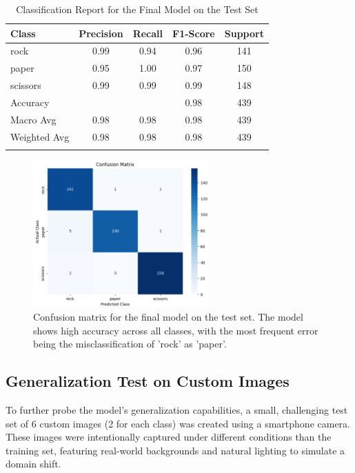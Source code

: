 \documentclass[pdflatex,sn-mathphys-num]{sn-jnl}%
\theoremstyle{thmstyleone}%
\theoremstyle{thmstyletwo}%
\theoremstyle{thmstylethree}%
\begin{document}
\begin{table}[h]
\caption{Classification Report for the Final Model on the Test Set}\label{tab:report}%
\begin{tabular}{@{}lcccc@{}}
\toprule
Class & Precision & Recall & F1-Score & Support \\
\midrule
rock     & 0.99 & 0.94 & 0.96 & 141 \\
paper    & 0.95 & 1.00 & 0.97 & 150 \\
scissors & 0.99 & 0.99 & 0.99 & 148 \\
\midrule
Accuracy &      &      & 0.98 & 439 \\
Macro Avg & 0.98 & 0.98 & 0.98 & 439 \\
Weighted Avg & 0.98 & 0.98 & 0.98 & 439 \\
\botrule
\end{tabular}
\end{table}

\begin{figure}[h]
\centering
\includegraphics[width=0.6\textwidth]{confusion_matrix.png}
\caption{Confusion matrix for the final model on the test set. The model shows high accuracy across all classes, with the most frequent error being the misclassification of 'rock' as 'paper'.}\label{fig:cm}
\end{figure}

\subsection{Generalization Test on Custom Images}
To further probe the model's generalization capabilities, a small, challenging test set of 6 custom images (2 for each class) was created using a smartphone camera. These images were intentionally captured under different conditions than the training set, featuring real-world backgrounds and natural lighting to simulate a domain shift.
\end{document}
